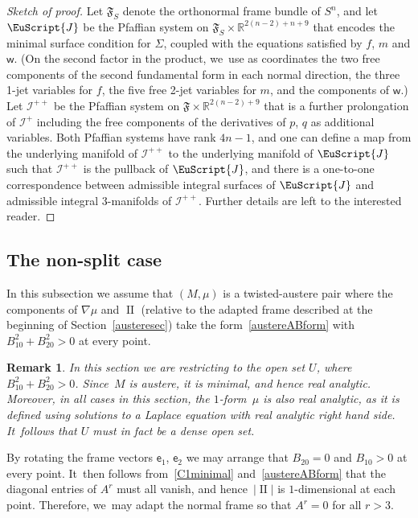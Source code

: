 \documentclass[pdftex]{sigma}
\def\R{\mathbb{R}}
\def\ve{\mathsf{e}}
\def\vw{\mathsf{w}}
\def\II{\operatorname{II}} %
\def\F{\mathfrak{F}}
\def\calI{\mathcal{I}}
\def\J{\EuScript{J}}
\newtheorem{Remark}[Theorem]{Remark}}
\numberwithin{equation}{section}
\begin{document}
\begin{proof}[Sketch of proof]
Let $\F_S$ denote the orthonormal frame bundle of $S^n$, and let $\J$ be the Pfaffian system on $\F_S \times \R^{2(n-2) + n+9}$ that encodes the minimal surface condition for $\Sigma$, coupled with the equations satisfied by $f$, $m$ and $\vw$. (On the second factor in the product, we~use as coordinates the two free components of the second fundamental form in each normal direction, the three 1-jet variables for $f$, the five free 2-jet variables for $m$, and the components of $\vw$.) Let $\calI^{++}$ be the Pfaffian system on $\F \times \R^{2(n-2)+9}$ that is a further prolongation of $\calI^+$ including the free components of the derivatives of $p$, $q$ as additional variables. Both Pfaffian systems have rank $4n-1$, and one can define a map from the underlying manifold of $\calI^{++}$ to the underlying manifold of $\J$ such that $\calI^{++}$ is the pullback of $\J$, and there is a one-to-one correspondence between admissible integral surfaces of $\J$ and admissible integral 3-manifolds of $\calI^{++}$. Further details are left to the interested reader.
\end{proof}

\subsection{The non-split case}

In this subsection we assume that $(M,\mu)$ is a twisted-austere pair where the components of $\nabla \mu$ and $\II$ (relative to the adapted frame described at the beginning of Section~\ref{austeresec}) take the form~\eqref{austereABform} with $B_{10}^2 + B_{20}^2 > 0$ at every point.

\begin{Remark} \label{analytic-rmk}
In this section we are restricting to the open set $U$, where $B_{10}^2 + B_{20}^2 > 0$. Since~$M$ is austere, it is minimal, and hence real analytic. Moreover, in all cases in this section, the \mbox{$1$-form}~$\mu$ is also real analytic, as it is defined using solutions to a Laplace equation with real analytic right hand side. It~follows that $U$ must in fact be a \emph{dense} open set.
\end{Remark}

By rotating the frame vectors $\ve_1$, $\ve_2$ we may arrange that $B_{20}=0$ and $B_{10}>0$ at every point. It~then follows from~\eqref{C1minimal} and~\eqref{austereABform} that the diagonal entries of $A^r$ must all vanish, and hence~$|\II|$ is $1$-dimensional at each point. Therefore, we~may adapt the normal frame so that $A^r = 0$ for all $r>3$.
\end{document}
